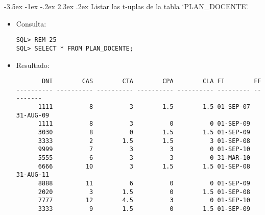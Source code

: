 \documentclass[11pt]{report}
\makeatletter
\renewcommand\chapter{\@startsection{chapter}{0}{\z@}%
    {-3.5ex \@plus -1ex \@minus -.2ex}%
    {2.3ex \@plus.2ex}%
    {\normalfont\Large\bfseries}}
\makeatother
\begin{document}
\chapter{Listar las t-uplas de la tabla ‘PLAN\_DOCENTE’.}
\begin{itemize}
  \item Consulta:
  \begin{verbatim}
SQL> REM 25
SQL> SELECT * FROM PLAN_DOCENTE;
  \end{verbatim}
  \item{Resultado:}
  \begin{verbatim}
       DNI        CAS        CTA        CPA        CLA FI        FF                                                                                                                                     
---------- ---------- ---------- ---------- ---------- --------- ---------                                                                                                                              
      1111          8          3        1.5        1.5 01-SEP-07 31-AUG-09                                                                                                                              
      1111          8          3          0          0 01-SEP-09                                                                                                                                        
      3030          8          0        1.5        1.5 01-SEP-09                                                                                                                                        
      3333          2        1.5        1.5          3 01-SEP-08                                                                                                                                        
      9999          7          3          3          0 01-SEP-10                                                                                                                                        
      5555          6          3          3          0 31-MAR-10                                                                                                                                        
      6666         10          3        1.5        1.5 01-SEP-08 31-AUG-11                                                                                                                              
      8888         11          6          0          0 01-SEP-09                                                                                                                                        
      2020          3        1.5          0        1.5 01-SEP-08                                                                                                                                        
      7777         12        4.5          3          0 01-SEP-10                                                                                                                                        
      3333          9        1.5          0        1.5 01-SEP-09                                                                                                                                        


\end{verbatim}
\end{itemize}
\end{document}
